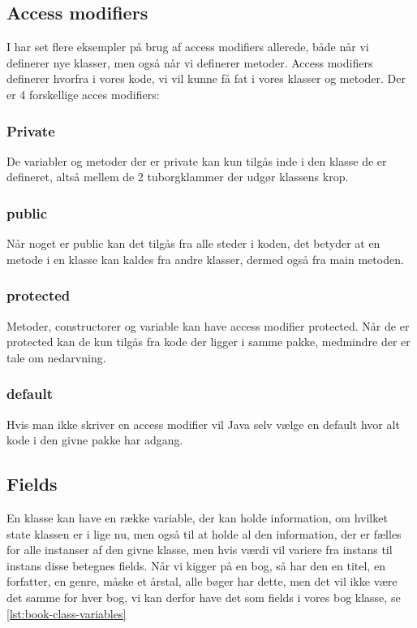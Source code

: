 \subsection{Access modifiers}

I har set flere eksempler på brug af access modifiers allerede, både når vi definerer nye klasser, men også når vi definerer metoder. Access modifiers definerer hvorfra i vores kode, vi vil kunne få fat i vores klasser og metoder. Der er 4 forskellige acces modifiers:

\subsubsection{Private}

De variabler og metoder der er private kan kun tilgås inde i den klasse de er defineret, altså mellem de 2 tuborgklammer der udgør klassens krop.

\subsubsection{public} 

Når noget er public kan det tilgås fra alle steder i koden, det betyder at en metode i en klasse kan kaldes fra andre klasser, dermed også fra main metoden.

\subsubsection{protected} 

Metoder, constructorer og variable kan have access modifier protected. Når de er protected kan de kun tilgås fra kode der ligger i samme pakke, medmindre der er tale om nedarvning.

\subsubsection{default} 

Hvis man ikke skriver en access modifier vil Java selv vælge en default hvor alt kode i den givne pakke har adgang.

\subsection{Fields}
En klasse kan have en række variable, der kan holde information, om hvilket state klassen er i lige nu, men også til at holde al den information, der er fælles for alle instanser af den givne klasse, men hvis værdi vil variere fra instans til instans disse betegnes fields. Når vi kigger på en bog, så har den en titel, en forfatter, en genre, måske et årstal, alle bøger har dette, men det vil ikke være det samme for hver bog, vi kan derfor have det som fields i vores bog klasse, se \autoref{lst:book-class-variables}

